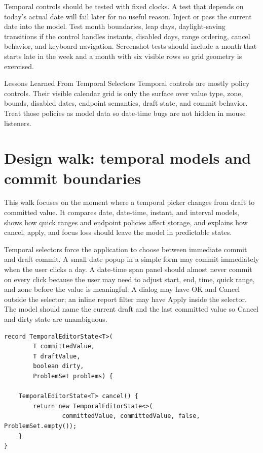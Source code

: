 Temporal controls should be tested with fixed clocks. A test that depends on today's
actual date will fail later for no useful reason. Inject
or pass the current date into the model. Test month boundaries, leap days,
daylight-saving transitions if the control handles instants, disabled days, range
ordering, cancel behavior, and keyboard navigation. Screenshot tests should include a
month that starts late in the week and a month with six visible rows so grid geometry is
exercised.

\begin{principlebox}{Lessons Learned From Temporal Selectors}
Temporal controls are mostly policy controls. Their visible calendar grid is
only the surface over value type, zone, bounds, disabled dates, endpoint
semantics, draft state, and commit behavior. Treat those policies as model data
so date-time bugs are not hidden in mouse listeners.
\end{principlebox}

\section{Design walk: temporal models and commit boundaries}

\begin{roadmapbox}
This walk focuses on the moment where a temporal picker changes from draft to
committed value. It compares date, date-time, instant, and interval models,
shows how quick ranges and endpoint policies affect storage, and explains how
cancel, apply, and focus loss should leave the model in predictable states.
\end{roadmapbox}

Temporal selectors force the application to choose between immediate commit and draft
commit. A small date popup in a simple form may commit immediately when the user clicks
a day. A date-time span panel should almost never commit on every click because the user
may need to adjust start, end, time, quick range, and zone before the value is
meaningful. A dialog may have OK and Cancel outside the selector; an inline report
filter may have Apply inside the selector. The model should name the current draft and
the last committed value so Cancel and dirty state are unambiguous.

\begin{lstlisting}[caption={Temporal editor state separates draft from committed value.}]
record TemporalEditorState<T>(
        T committedValue,
        T draftValue,
        boolean dirty,
        ProblemSet problems) {

    TemporalEditorState<T> cancel() {
        return new TemporalEditorState<>(
                committedValue, committedValue, false, ProblemSet.empty());
    }
}
\end{lstlisting}

